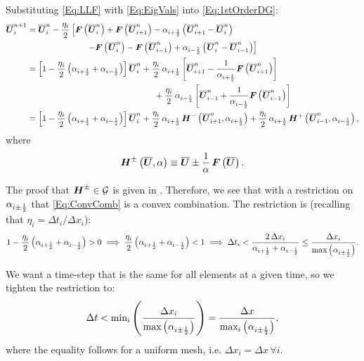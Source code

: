 \documentclass[10pt,preprint]{aastex}
\begin{document}
Substituting \eqref{Eq:LLF} with \eqref{Eq:EigVals} into \eqref{Eq:1stOrderDG}:
\begin{align}
    \ol{\bU}^{n+1}_{i}&=\ol{\bU}^{n}_{i}-\f{\eta_{i}}{2}\left[\bF\left(\ol{\bU}^{n}_{i}\right)+\bF\left(\ol{\bU}^{n}_{i+1}\right)-\alpha_{\iph}\left(\ol{\bU}^{n}_{i+1}-\ol{\bU}^{n}_{i}\right)\right.\nonumber\\
    &\left.\hspace{7em}-\bF\left(\ol{\bU}^{n}_{i}\right)-\bF\left(\ol{\bU}^{n}_{i-1}\right)+\alpha_{\imh}\left(\ol{\bU}^{n}_{i}-\ol{\bU}^{n}_{i-1}\right)\right]\nonumber\\
    &=\left[1-\f{\eta_{i}}{2}\left(\alpha_{\iph}+\alpha_{\imh}\right)\right]\ol{\bU}^{n}_{i}+\f{\eta_{i}}{2}\,\alpha_{\iph}\left[\ol{\bU}^{n}_{i+1}-\f{1}{\alpha_{\iph}}\bF\left(\ol{\bU}^{n}_{i+1}\right)\right]\nonumber\\
    &\hspace{15em}+\f{\eta_{i}}{2}\,\alpha_{\imh}\left[\ol{\bU}^{n}_{i-1}+\f{1}{\alpha_{\imh}}\bF\left(\ol{\bU}^{n}_{i-1}\right)\right]\nonumber\\
    &=\left[1-\f{\eta_{i}}{2}\left(\alpha_{\iph}+\alpha_{\imh}\right)\right]\ol{\bU}^{n}_{i}+\f{\eta_{i}}{2}\,\alpha_{\iph}\,\bH^{-}\left(\ol{\bU}^{n}_{i+1},\alpha_{\iph}\right)+\f{\eta_{i}}{2}\,\alpha_{\iph}\,\bH^{+}\left(\ol{\bU}^{n}_{i-1},\alpha_{\imh}\right),\label{Eq:ConvComb}
\end{align}
where
\begin{equation}\label{Eq:Hpm}
    \boldsymbol{H}^{\pm}\left(\overline{\boldsymbol{U}},\alpha\right)\equiv\overline{\boldsymbol{U}}\pm\frac{1}{\alpha}\,\boldsymbol{F}\left(\overline{\boldsymbol{U}}\right).
\end{equation}

The proof that $\boldsymbol{H}^{\pm}\in\mathcal{G}$ is given in \citet{Qin2016}. Therefore, we see that with a restriction on $\alpha_{i\pm\frac{1}{2}}$ that \eqref{Eq:ConvComb} is a convex combination. The restriction is (recalling that $\eta_{i}=\Delta t_{i}/\Delta x_{i}$):
\begin{equation}
    1-\frac{\eta_{i}}{2}\left(\alpha_{i+\frac{1}{2}}+\alpha_{i-\frac{1}{2}}\right)>0\implies\frac{\eta_{i}}{2}\left(\alpha_{i+\frac{1}{2}}+\alpha_{i-\frac{1}{2}}\right)<1\implies \Delta t_{i}<\frac{2\,\Delta x_{i}}{\alpha_{i+\frac{1}{2}}+\alpha_{i-\frac{1}{2}}}\leq\frac{\Delta x_{i}}{\text{max}\left(\alpha_{i\pm\frac{1}{2}}\right)}.
\end{equation}

We want a time-step that is the same for all elements at a given time, so we tighten the restriction to:
\begin{equation}
    \Delta t<\text{min}_{i}\left(\frac{\Delta x_{i}}{\text{max}\left(\alpha_{i\pm\frac{1}{2}}\right)}\right)=\frac{\Delta x}{\text{max}_{i}\left(\alpha_{i\pm\frac{1}{2}}\right)},
\end{equation}
where the equality follows for a uniform mesh, i.e. $\Delta x_{i}=\Delta x\,\forall i$.
\end{document}
